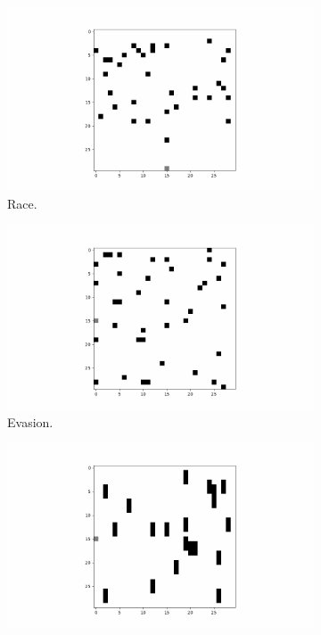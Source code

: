 \begin{figure}[ht!]
	\centering
	\begin{subfigure}{0.24\columnwidth}
		\centering
		\includegraphics[width=\linewidth,trim={9cm 0 9cm 0},clip]{documentation/report/img/race.png}
		\caption{Race.\newline}
		\label{subfig:race}
	\end{subfigure}%
	\begin{subfigure}{0.24\columnwidth}
		\centering
		\includegraphics[width=\linewidth,trim={9cm 0 9cm 0},clip]{documentation/report/img/evasion.png}
		\caption{Evasion.\newline}
		\label{subfig:evasion}
	\end{subfigure}
	\centering
	\begin{subfigure}{0.24\columnwidth}
		\centering
		\includegraphics[width=\linewidth,trim={9cm 0 9cm 0},clip]{documentation/report/img/walls.png}

\end{subfigure}
\end{figure}
